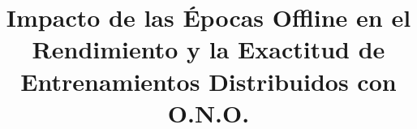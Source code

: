 \documentclass[conference,10pt]{IEEEtran}
\begin{document}
\title{Impacto de las Épocas Offline en el Rendimiento y la Exactitud de Entrenamientos Distribuidos con O.N.O.}

\author{
}

\maketitle









\nocite{*} 


\end{document}
